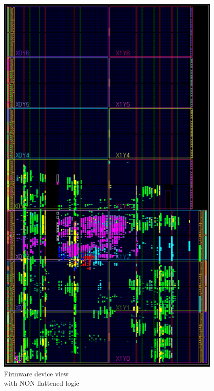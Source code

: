\begin{figure}[H]
	\centering
	\begin{minipage}{.5\textwidth}
		\centering
		\includegraphics[width=.85\linewidth]{IMG/ch4/FirmwareNOFLAT/DEVICE}
		\caption{Firmware device view \\with NON flattened logic}
		\label{fig:noflatdevice}
	\end{minipage}%
	\begin{minipage}{.5\textwidth}
		\centering

\end{minipage}
\end{figure}
